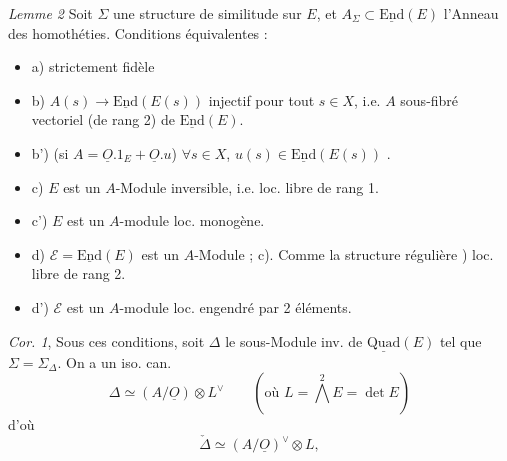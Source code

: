 \documentclass[11pt,a4paper]{article}
\begin{document}
\emph{Lemme 2} Soit $\Sigma$ une structure de similitude sur $E$, et $A_\Sigma \subset \underline{\mathrm{End}}(E)$ l'Anneau des homothéties. Conditions équivalentes :
\begin{itemize}
  \item a)  strictement fidèle 
  \item b) $A(s) \to \underline{\mathrm{End}}(E(s))$ injectif pour tout $s \in X$, i.e. $A$ sous-fibré vectoriel (de rang 2) de $\underline{\mathrm{End}}(E)$.
  \item b') (si $A = \underline{O}.1_E + \underline{O}.u$) $\forall s \in X$, $u(s) \in \underline{\mathrm{End}}(E(s))$ .
  \item c) $E$ est un $A$-Module  inversible, i.e. loc. libre de rang 1.
  \item c') $E$ est un $A$-module loc. monogène.
  \item d) $\mathcal{E} = \underline{\mathrm{End}}(E)$ est un $A$-Module ; c). Comme la structure régulière \ill{}) loc. libre de rang 2.
  \item d') $\mathcal{E}$ est un $A$-module loc. engendré par 2 éléments.
\end{itemize}

\emph{Cor. 1}, Sous ces conditions, soit $\Delta$ le sous-Module  inv. de $\underline{\mathrm{Quad}}(E)$ tel que $\Sigma = \Sigma_\Delta$. On a un iso. can.
\[
  \Delta \simeq (A/\underline{O}) \otimes L^\vee \qquad (\text{où } L = \textstyle\bigwedge^2 E = \det E)
\]
d'où
\[
  \check\Delta \simeq (A/\underline{O})^\vee \otimes L ,
\]
\end{document}
